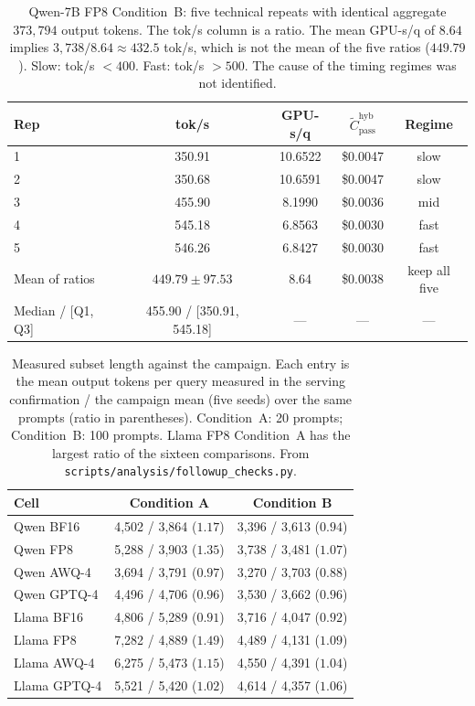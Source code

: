 \documentclass[11pt,a4paper]{article}
\begin{document}
\begin{table}[!htbp]
\centering
\caption{Qwen-7B FP8 Condition~B: five technical repeats with identical aggregate $373{,}794$ output tokens. The tok/s column is a ratio. The mean GPU-s/q of $8.64$ implies $3{,}738/8.64 \approx 432.5$ tok/s, which is not the mean of the five ratios ($449.79$). Slow: tok/s $<400$. Fast: tok/s $>500$. The cause of the timing regimes was not identified.}
\label{tab:fp8-reps}
\small
\begin{tabular}{lcccc}
\toprule
\textbf{Rep} & \textbf{tok/s} & \textbf{GPU-s/q} & \textbf{$\widetilde{C}_{\mathrm{pass}}^{\mathrm{hyb}}$} & \textbf{Regime} \\
\midrule
1 & 350.91 & 10.6522 & \$0.0047 & slow \\
2 & 350.68 & 10.6591 & \$0.0047 & slow \\
3 & 455.90 & 8.1990 & \$0.0036 & mid \\
4 & 545.18 & 6.8563 & \$0.0030 & fast \\
5 & 546.26 & 6.8427 & \$0.0030 & fast \\
\midrule
Mean of ratios & $449.79\pm 97.53$ & 8.64 & \$0.0038 & keep all five \\
Median / [Q1, Q3] & 455.90 / [350.91, 545.18] & --- & --- & --- \\
\bottomrule
\end{tabular}
\end{table}

\begin{table}[!htbp]
\centering
\caption{Measured subset length against the campaign. Each entry is the mean output tokens per query measured in the serving confirmation / the campaign mean (five seeds) over the same prompts (ratio in parentheses). Condition~A: 20 prompts; Condition~B: 100 prompts. Llama FP8 Condition~A has the largest ratio of the sixteen comparisons. From \texttt{scripts/analysis/followup\_checks.py}.}
\label{tab:subsetlen}
\small
\begin{tabular}{lcc}
\toprule
\textbf{Cell} & \textbf{Condition A} & \textbf{Condition B} \\
\midrule
Qwen BF16 & 4{,}502 / 3{,}864 ($1.17$) & 3{,}396 / 3{,}613 ($0.94$) \\
Qwen FP8 & 5{,}288 / 3{,}903 ($1.35$) & 3{,}738 / 3{,}481 ($1.07$) \\
Qwen AWQ-4 & 3{,}694 / 3{,}791 ($0.97$) & 3{,}270 / 3{,}703 ($0.88$) \\
Qwen GPTQ-4 & 4{,}496 / 4{,}706 ($0.96$) & 3{,}530 / 3{,}662 ($0.96$) \\
\midrule
Llama BF16 & 4{,}806 / 5{,}289 ($0.91$) & 3{,}716 / 4{,}047 ($0.92$) \\
Llama FP8 & 7{,}282 / 4{,}889 ($1.49$) & 4{,}489 / 4{,}131 ($1.09$) \\
Llama AWQ-4 & 6{,}275 / 5{,}473 ($1.15$) & 4{,}550 / 4{,}391 ($1.04$) \\
Llama GPTQ-4 & 5{,}521 / 5{,}420 ($1.02$) & 4{,}614 / 4{,}357 ($1.06$) \\
\bottomrule
\end{tabular}
\end{table}
\end{document}
